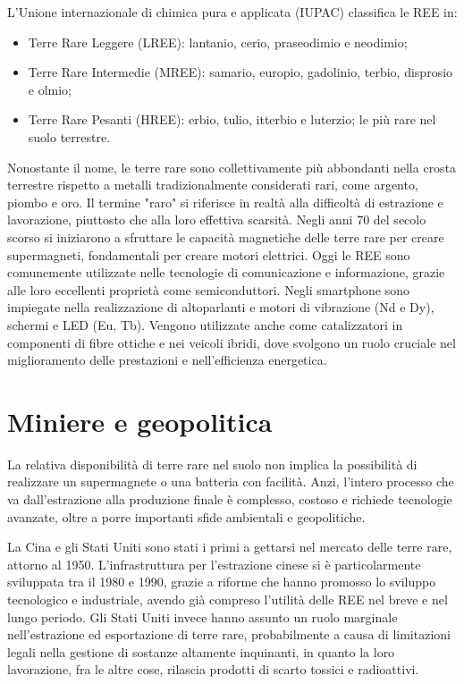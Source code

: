 \documentclass[12pt,a4paper,oneside]{book}
\begin{document}
L'Unione internazionale di chimica pura e applicata (IUPAC) classifica le REE in:
\begin{itemize}
	\item Terre Rare Leggere (LREE): lantanio, cerio, praseodimio e neodimio;
	\item Terre Rare Intermedie (MREE): samario, europio, gadolinio, terbio, disprosio e olmio;
	\item Terre Rare Pesanti (HREE): erbio, tulio, itterbio e luterzio; le più rare nel suolo terrestre.
\end{itemize}

Nonostante il nome, le terre rare sono collettivamente più abbondanti nella crosta terrestre rispetto a metalli tradizionalmente considerati rari, come argento, piombo e oro. Il termine "raro" si riferisce in realtà alla difficoltà di estrazione e lavorazione, piuttosto che alla loro effettiva scarsità.
Negli anni 70 del secolo scorso si iniziarono a sfruttare le capacità magnetiche delle terre rare per creare supermagneti, fondamentali per creare motori elettrici.
Oggi le REE sono comunemente utilizzate nelle tecnologie di comunicazione e informazione, grazie alle loro eccellenti proprietà come semiconduttori. Negli smartphone sono impiegate nella realizzazione di altoparlanti e motori di vibrazione (Nd e Dy), schermi e LED (Eu, Tb). Vengono utilizzate anche come catalizzatori in componenti di fibre ottiche e nei veicoli ibridi, dove svolgono un ruolo cruciale nel miglioramento delle prestazioni e nell'efficienza energetica.

\section{Miniere e geopolitica}
La relativa disponibilità di terre rare nel suolo non implica la possibilità di realizzare un supermagnete o una batteria con facilità. Anzi, l'intero processo che va dall'estrazione alla produzione finale è complesso, costoso e richiede tecnologie avanzate, oltre a porre importanti sfide ambientali e geopolitiche.

La Cina e gli Stati Uniti sono stati i primi a gettarsi nel mercato delle terre rare, attorno al 1950. L'infrastruttura per l'estrazione cinese si è particolarmente sviluppata tra il 1980 e 1990, grazie a riforme che hanno promosso lo sviluppo tecnologico e industriale, avendo già compreso l'utilità delle REE nel breve e nel lungo periodo. Gli Stati Uniti invece hanno assunto un ruolo marginale nell'estrazione ed esportazione di terre rare, probabilmente a causa di limitazioni legali nella gestione di sostanze altamente inquinanti, in quanto la loro lavorazione, fra le altre cose, rilascia prodotti di scarto tossici e radioattivi.
\end{document}
